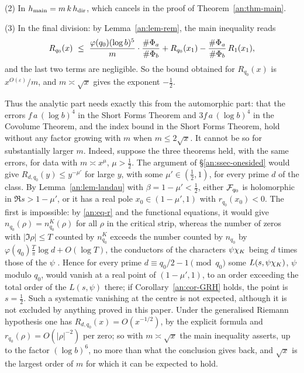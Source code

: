 \documentclass[10pt]{amsart}
\theoremstyle{definition}
\theoremstyle{remark}
\begin{document}
(2) In $h_{\mathrm{main}}=m\,k\,h_{\mathrm{dir}}$, which cancels in the proof of
Theorem~\ref{an:thm-main}.

(3) In the final division: by Lemma~\ref{an:lem-rem}, the main inequality
reads
\[
 R_{q_0}(x)\ \le\ \frac{\varphi(q_0)(\log b)^{5}}{m}\cdot\frac{\#\anPa}{\#\anPb}+R_{q_0}(x_1)-\frac{\#\anPa}{\#\anPb}\,R_1(x_1),
\]
and the last two terms are negligible. So the bound obtained for $R_{q_0}(x)$
is $x^{O(\varepsilon)}/m$, and $m\asymp\sqrt x$ gives the exponent
$-\frac12$.

Thus the analytic part needs exactly this from the automorphic part: that
the errors $f\,a\,(\log b)^{4}$ in the Short Forms Theorem and $3f\,a\,(\log b)^{4}$ in the Covolume Theorem, and the index bound in the Short Forms Theorem, hold without any factor
growing with $m$ when $m\le2\sqrt x$. It cannot be so for substantially
larger $m$. Indeed, suppose the three theorems held, with the same errors,
for data with $m\asymp x^{\mu}$, $\mu>\frac12$. The argument of
\S\ref{an:ssec-onesided} would give $R_{d,q_0}(y)\le y^{-\mu'}$ for large
$y$, with some $\mu'\in(\frac12,1)$, for every prime $d$ of the class. By
Lemma~\ref{an:lem-landau} with $\beta=1-\mu'<\frac12$, either $\mathcal F_{q_0}$ is
holomorphic in $\Re s>1-\mu'$, or it has a real pole $x_0\in(1-\mu',1)$ with
$r_{q_0}(x_0)<0$. The first is impossible: by \eqref{an:eq-r} and the
functional equations, it would give $n_{q_0}(\rho)=n_{q_0}^{K}(\rho)$ for all
$\rho$ in the critical strip, whereas the number of zeros with
$|\Im\rho|\le T$ counted by $n^{K}_{q_0}$ exceeds the number counted by
$n_{q_0}$ by $\varphi(q_0)\frac T\pi\log d+O(\log T)$, the conductors of the
characters $\psi\chi_K$ being $d$ times those of the $\psi$
\cite[Chapter~16]{Davenport}. Hence for every prime
$d\equiv q_0/2-1\pmod{q_0}$ some $L(s,\psi\chi_K)$, $\psi$ modulo $q_0$,
would vanish at a real point of $(1-\mu',1)$, to an order exceeding the
total order of the $L(s,\psi)$ there; if Corollary~\ref{an:cor-GRH} holds, the
point is $s=\frac12$. Such a systematic vanishing at the centre is not
expected, although it is not excluded by anything proved in this paper.
Under the generalised Riemann hypothesis one has
$R_{d,q_0}(x)=O(x^{-1/2})$, by the explicit formula and
$r_{q_0}(\rho)=O(|\rho|^{-2})$ per zero; so with $m\asymp\sqrt x$ the main
inequality asserts, up to the factor $(\log b)^{6}$, no more than what the
conclusion gives back, and $\sqrt x$ is the largest order of $m$ for which
it can be expected to hold.
\end{document}
